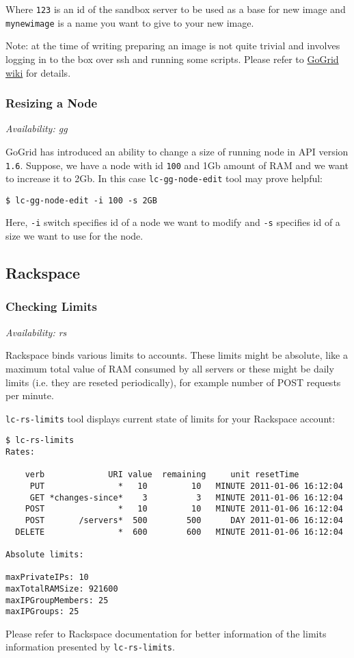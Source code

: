 \documentclass[a4paper]{report}
\begin{document}
Where \texttt{123} is an id of the sandbox server to be used as a base for new image and
\texttt{mynewimage} is a name you want to give to your new image.

Note: at the time of writing preparing an image is not quite trivial and involves logging in
to the box over ssh and running some scripts. Please refer to 
\href{http://wiki.gogrid.com/wiki/index.php/MyGSI}{GoGrid wiki} for details.

\subsubsection{Resizing a Node}

\textit{Availability: gg}

GoGrid has introduced an ability to change a size of running node in API version \texttt{1.6}.
Suppose, we have a node with id \texttt{100} and 1Gb amount of RAM and we want to increase it
to 2Gb. In this case \texttt{lc-gg-node-edit} tool may prove helpful:

\begin{verbatim}
$ lc-gg-node-edit -i 100 -s 2GB
\end{verbatim}

Here, \texttt{-i} switch specifies id of a node we want to modify and \texttt{-s} specifies
id of a size we want to use for the node.

\subsection{Rackspace}

\subsubsection{Checking Limits}

\textit{Availability: rs}

Rackspace binds various limits to accounts. These limits might be absolute, like a
maximum total value of RAM consumed by all servers or these might be daily limits
(i.e. they are reseted periodically), for example number of POST requests per minute.

\texttt{lc-rs-limits} tool displays current state of limits for your Rackspace account:

\begin{verbatim}
$ lc-rs-limits
Rates:
    
    verb             URI value  remaining     unit resetTime
     PUT               *   10         10   MINUTE 2011-01-06 16:12:04
     GET *changes-since*    3          3   MINUTE 2011-01-06 16:12:04
    POST               *   10         10   MINUTE 2011-01-06 16:12:04
    POST       /servers*  500        500      DAY 2011-01-06 16:12:04
  DELETE               *  600        600   MINUTE 2011-01-06 16:12:04

Absolute limits:

maxPrivateIPs: 10
maxTotalRAMSize: 921600
maxIPGroupMembers: 25
maxIPGroups: 25
\end{verbatim}

Please refer to Rackspace documentation for better information of the
limits information presented by \texttt{lc-rs-limits}.
\end{document}
